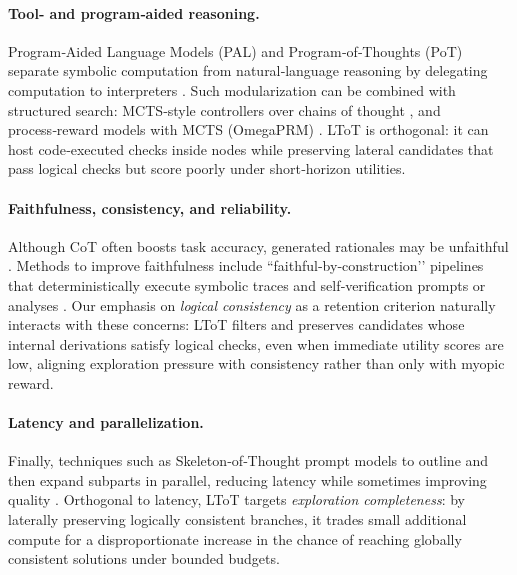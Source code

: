 \documentclass{article}
\begin{document}
\paragraph{Tool‑ and program‑aided reasoning.}
Program‑Aided Language Models (PAL) and Program‑of‑Thoughts (PoT) separate symbolic computation from natural‑language reasoning by delegating computation to interpreters \citep{gao2022pal,chen2022pot}. Such modularization can be combined with structured search: MCTS‑style controllers over chains of thought \citep{xie2024mcts}, and process‑reward models with MCTS (OmegaPRM) \citep{luo2024omegaprm}. LToT is orthogonal: it can host code‑executed checks inside nodes while preserving lateral candidates that pass logical checks but score poorly under short‑horizon utilities.

\paragraph{Faithfulness, consistency, and reliability.}
Although CoT often boosts task accuracy, generated rationales may be unfaithful \citep{turpin2023dontsaysay,lanham2023measurefaithfulness}. Methods to improve faithfulness include “faithful‑by‑construction’’ pipelines that deterministically execute symbolic traces \citep{lyu2023faithfulcot} and self‑verification prompts or analyses \citep{weng2022selfverification}. Our emphasis on \emph{logical consistency} as a retention criterion naturally interacts with these concerns: LToT filters and preserves candidates whose internal derivations satisfy logical checks, even when immediate utility scores are low, aligning exploration pressure with consistency rather than only with myopic reward.

\paragraph{Latency and parallelization.}
Finally, techniques such as Skeleton‑of‑Thought prompt models to outline and then expand subparts in parallel, reducing latency while sometimes improving quality \citep{ning2023sot}. Orthogonal to latency, LToT targets \emph{exploration completeness}: by laterally preserving logically consistent branches, it trades small additional compute for a disproportionate increase in the chance of reaching globally consistent solutions under bounded budgets.
\end{document}
